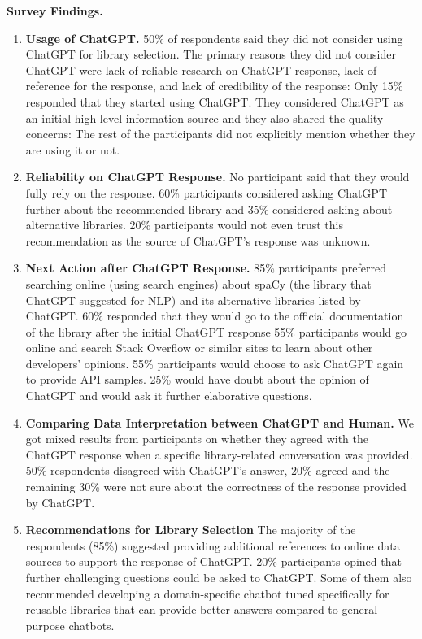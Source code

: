 \textbf{Survey Findings.}
\begin{enumerate}
    \item \textbf{Usage of ChatGPT.} 
    50\% of respondents said they did not consider using ChatGPT for library selection. The primary reasons they did not consider ChatGPT were lack of reliable research on ChatGPT response, lack of reference for the response, and lack of credibility of the response: 
    Only 15\% responded that they started using ChatGPT. They considered ChatGPT as an initial high-level information source and they also shared the quality concerns: 
    The rest of the participants did not explicitly mention whether they are using it or not. 
    \item \textbf{Reliability on ChatGPT Response.} 
    No participant said that they would fully rely on the response.
    60\% participants considered asking ChatGPT further about the recommended library and 35\% considered asking about alternative libraries.
    20\% participants would not even trust this recommendation as the source of ChatGPT's response was unknown.
    \item \textbf{Next Action after ChatGPT Response.} 
    85\% participants preferred searching online (using search engines) about spaCy (the library that ChatGPT suggested for NLP) and its alternative libraries listed by ChatGPT.
    60\% responded that they would go to the official documentation of the library after the initial ChatGPT response 
    55\% participants would go online and search Stack Overflow or similar sites to learn about other developers' opinions.
    55\% participants would choose to ask ChatGPT again to provide API samples. 25\% would have doubt about the opinion of ChatGPT and would ask it further elaborative questions.
    
    \item \textbf{Comparing Data Interpretation between ChatGPT and Human.}
    We got mixed results from participants on whether they agreed with the ChatGPT response when a specific library-related conversation was provided. 50\% respondents disagreed with ChatGPT's answer, 20\% agreed and the remaining 30\% were not sure about the correctness of the response provided by ChatGPT.

    \item \textbf{Recommendations for Library Selection}
    The majority of the respondents (85\%) suggested providing additional references to online data sources to support the response of ChatGPT. 20\% participants opined that further challenging questions could be asked to ChatGPT. Some of them also recommended developing a domain-specific chatbot tuned specifically for reusable libraries that can provide better answers compared to general-purpose chatbots.
\end{enumerate}

